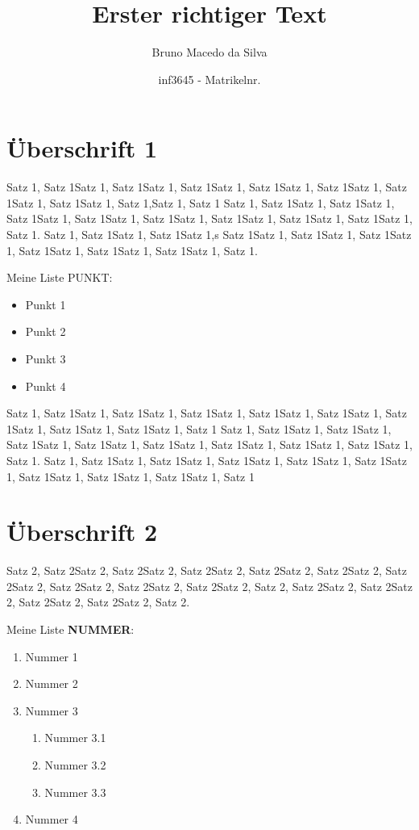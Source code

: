 \documentclass[pdftex, a4paper]{scrartcl}
\title{Erster richtiger Text}
\author{Bruno Macedo da Silva}
\author{inf3645 - Matrikelnr.}
\begin{document}
    \maketitle
    
    \tableofcontents

    \section{Überschrift 1}

    Satz 1, Satz 1Satz 1, Satz 1Satz 1, Satz 1Satz 1, Satz 1Satz 1, Satz 1Satz 1, Satz 1Satz 1, Satz 1Satz 1, Satz 1,Satz 1, Satz 1
    Satz 1, Satz 1Satz 1, Satz 1Satz 1, Satz 1Satz 1, Satz 1Satz 1, Satz 1Satz 1, Satz 1Satz 1, Satz 1Satz 1, Satz 1Satz 1, Satz 1.
    Satz 1, Satz 1Satz 1, Satz 1Satz 1,s Satz 1Satz 1, Satz 1Satz 1, Satz 1Satz 1, Satz 1Satz 1, Satz 1Satz 1, Satz 1Satz 1, Satz 1.

    Meine Liste PUNKT:
    \begin{itemize}
        \item Punkt 1
        \item Punkt 2
        \item Punkt 3
        \item Punkt 4
    \end{itemize}

    Satz 1, Satz 1Satz 1, Satz 1Satz 1, Satz 1Satz 1, Satz 1Satz 1, Satz 1Satz 1, Satz 1Satz 1, Satz 1Satz 1, Satz 1Satz 1, Satz 1
    Satz 1, Satz 1Satz 1, Satz 1Satz 1, Satz 1Satz 1, Satz 1Satz 1, Satz 1Satz 1, Satz 1Satz 1, Satz 1Satz 1, Satz 1Satz 1, Satz 1.
    Satz 1, Satz 1Satz 1, Satz 1Satz 1, Satz 1Satz 1, Satz 1Satz 1, Satz 1Satz 1, Satz 1Satz 1, Satz 1Satz 1, Satz 1Satz 1, Satz 1

    \section{Überschrift 2}

    Satz 2, Satz 2Satz 2, Satz 2Satz 2, Satz 2Satz 2, Satz 2Satz 2, Satz 2Satz 2, Satz 2Satz 2, Satz 2Satz 2, Satz 2Satz 2, Satz 2Satz 2, 
    Satz 2, Satz 2Satz 2, Satz 2Satz 2, Satz 2Satz 2, Satz 2Satz 2, Satz 2.

    Meine Liste \textbf{NUMMER}:
    \begin{enumerate}
        \item Nummer 1
        \item Nummer 2
        \item Nummer 3
        \begin{enumerate}
            \item Nummer 3.1
            \item Nummer 3.2
            \item Nummer 3.3
        \end{enumerate}
        \item Nummer 4
    \end{enumerate}
\end{document}
